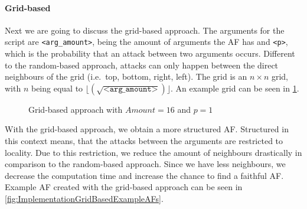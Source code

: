 \paragraph{Grid-based} Next we are going to discuss the grid-based approach. The arguments for the script are \texttt{<arg\_amount>}, being the amount of arguments the AF has and \texttt{<p>}, which is the probability that an attack between two arguments occurs. Different to the random-based approach, attacks can only happen between the direct neighbours of the grid (i.e.\ top, bottom, right, left). The grid is an $n \times n$ grid, with $n$ being equal to $\lfloor (\sqrt{\texttt{<arg\_amount>}}) \rfloor$. An example grid can be seen in \cref{fig:GridBasedApproach}.

\begin{figure}[h!]
    \centering
    \caption{Grid-based approach with $Amount=16$ and $p=1$}
    \label{fig:GridBasedApproach}
\end{figure}

With the grid-based approach, we obtain a more structured AF. Structured in this context means, that the attacks between the arguments are restricted to locality. Due to this restriction, we reduce the amount of neighbours drastically in comparison to the random-based approach. Since we have less neighbours, we decrease the computation time and increase the chance to find a faithful AF. Example AF created with the grid-based approach can be seen in \cref{fig:ImplementationGridBasedExampleAFs}.



